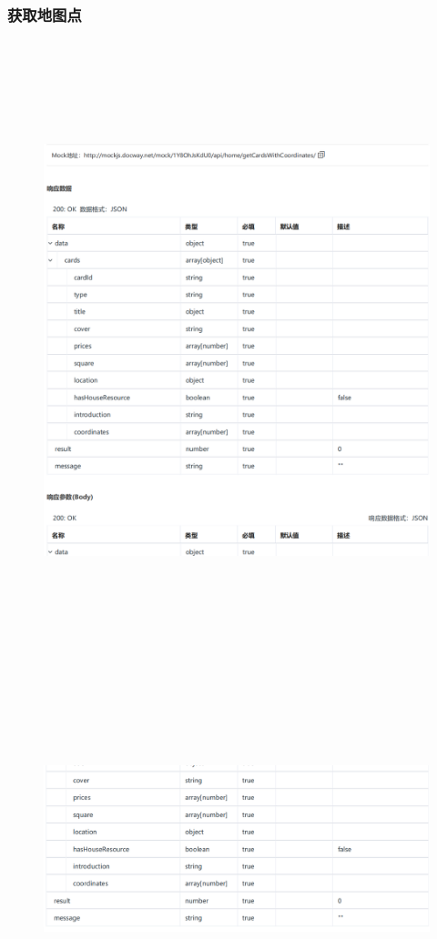        \subsubsection{获取地图点}        
        \begin{figure}[h]
            \centering
            \includegraphics[height=18.0cm,width=14.0cm]{design/image/api5.png} 
            \end{figure}    
    \newpage     
    \begin{figure}[h]
        \centering
        \includegraphics[height=10.0cm,width=14.0cm]{design/image/api7.png} 
        \end{figure}    
\newpage   
